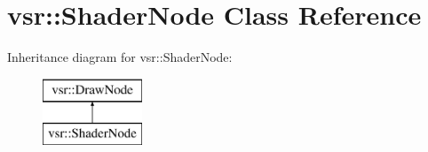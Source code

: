 \hypertarget{classvsr_1_1_shader_node}{\section{vsr\-:\-:Shader\-Node Class Reference}
\label{classvsr_1_1_shader_node}
}
Inheritance diagram for vsr\-:\-:Shader\-Node\-:\begin{figure}[H]
\begin{center}
\leavevmode
\includegraphics[height=2.000000cm]{classvsr_1_1_shader_node}
\end{center}
\end{figure}
